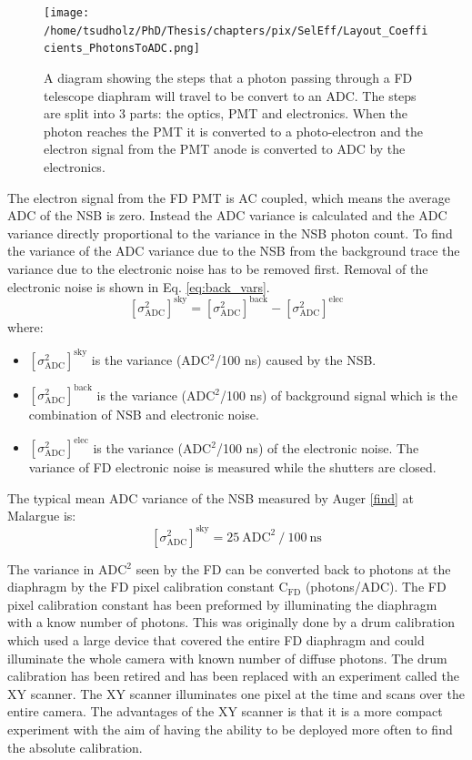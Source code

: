 \begin{figure}
\centering
\texttt{[image: /home/tsudholz/PhD/Thesis/chapters/pix/SelEff/Layout\_Coefficients\_PhotonsToADC.png]}
\caption{A diagram showing the steps that a photon passing through a FD telescope diaphram will travel to be convert to an ADC. The steps are split into 3 parts: the optics, PMT and electronics. When the photon reaches the PMT it is converted to a photo-electron and the electron signal from the PMT anode is converted to ADC by the electronics.} \label{fig:FD_CoefficientLayout_PhotonToADC}
\end{figure}
  
The electron signal from the FD PMT is AC coupled, which means the average ADC of the NSB is zero. Instead the ADC variance is calculated and the ADC variance directly proportional to the variance in the NSB photon count. To find the variance of the ADC variance due to the NSB from the background trace the variance due to the electronic noise has to be removed first. Removal of the electronic noise is shown in Eq. \ref{eq:back_vars}. 
\begin{equation}
\left[\sigma^2_{\mathrm{ADC}}\right]^{\mathrm{sky}} = \left[\sigma^2_{\mathrm{ADC}}\right]^{\mathrm{back}} - \left[\sigma^2_{\mathrm{ADC}}\right]^{\mathrm{elec}} \label{eq:back_vars}
\end{equation} 
where:
\begin{itemize}
\item[] $\left[\sigma^2_{\mathrm{ADC}}\right]^{\mathrm{sky}}$ is the variance (ADC$^2$/100 ns) caused by the NSB.
\item[] $\left[\sigma^2_{\mathrm{ADC}}\right]^{\mathrm{back}}$ is the variance (ADC$^2$/100 ns) of background signal which is the combination of NSB and electronic noise.
\item[] $\left[\sigma^2_{\mathrm{ADC}}\right]^{\mathrm{elec}}$ is the variance (ADC$^2$/100 ns) of the electronic noise. The variance of FD electronic noise is measured while the shutters are closed.
\end{itemize}
The typical mean ADC variance of the NSB measured by Auger \ref{find} at Malargue is:
\begin{equation}
\left[\sigma^2_{\mathrm{ADC}}\right]^{\mathrm{sky}} = 25 \ \mathrm{ADC}^2 \ / \ 100 \ \mathrm{ns} \nonumber
\end{equation}

The variance in ADC$^2$ seen by the FD can be converted back to photons at the diaphragm by the FD pixel calibration constant C$_{\mathrm{FD}}$ (photons/ADC). The FD pixel calibration constant has been preformed by illuminating the diaphragm with a know number of photons. This was originally done by a drum calibration which used a large device that covered the entire FD diaphragm and could illuminate the whole camera with known number of diffuse photons. The drum calibration has been retired and has been replaced with an experiment called the XY scanner. The XY scanner illuminates one pixel at the time and scans over the entire camera. The advantages of the XY scanner is that it is a more compact experiment with the aim of having the ability to be deployed more often to find the absolute calibration.

